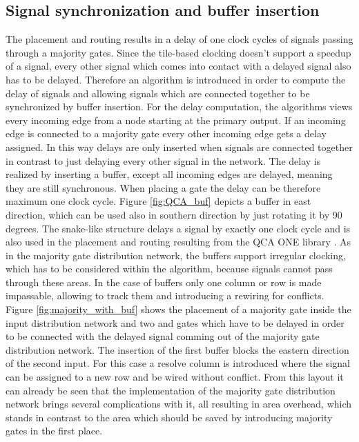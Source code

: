 \subsection{Signal synchronization and buffer insertion}
The placement and routing results in a delay of one clock cycles of signals passing through a majority gates. Since the tile-based clocking doesn't support a speedup of a signal, every other signal which comes into contact with a delayed signal also has to be delayed. Therefore an algorithm is introduced in order to compute the delay of signals and allowing signals which are connected together to be synchronized by buffer insertion. For the delay computation, the algorithms views every incoming edge from a node starting at the primary output. If an incoming edge is connected to a majority gate every other incoming edge gets a delay assigned. In this way delays are only inserted when signals are connected together in contrast to just delaying every other signal in the network. The delay is realized by inserting a buffer, except all incoming edges are delayed, meaning they are still synchronous. When placing a gate the delay can be therefore maximum one clock cycle. Figure \ref{fig:QCA_buf} depicts a buffer in east direction, which can be used also in southern direction by just rotating it by 90 degrees. The snake-like structure delays a signal by exactly one clock cycle and is also used in the placement and routing resulting from the QCA ONE library \cite{QCA_scl}. As in the majority gate distribution network, the buffers support irregular clocking, which has to be considered within the algorithm, because signals cannot pass through these areas. In the case of buffers only one column or row is made impassable, allowing to track them and introducing a rewiring for conflicts. Figure \ref{fig:majority_with_buf} shows the placement of a majority gate inside the input distribution network and two and gates which have to be delayed in order to be connected with the delayed signal comming out of the majority gate distribution network. The insertion of the first buffer blocks the eastern direction of the second input. For this case a resolve column is introduced where the signal can be assigned to a new row and be wired without conflict. From this layout it can already be seen that the implementation of the majority gate distribution network brings several complications with it, all resulting in area overhead, which stands in contrast to the area which should be saved by introducing majority gates in the first place.

